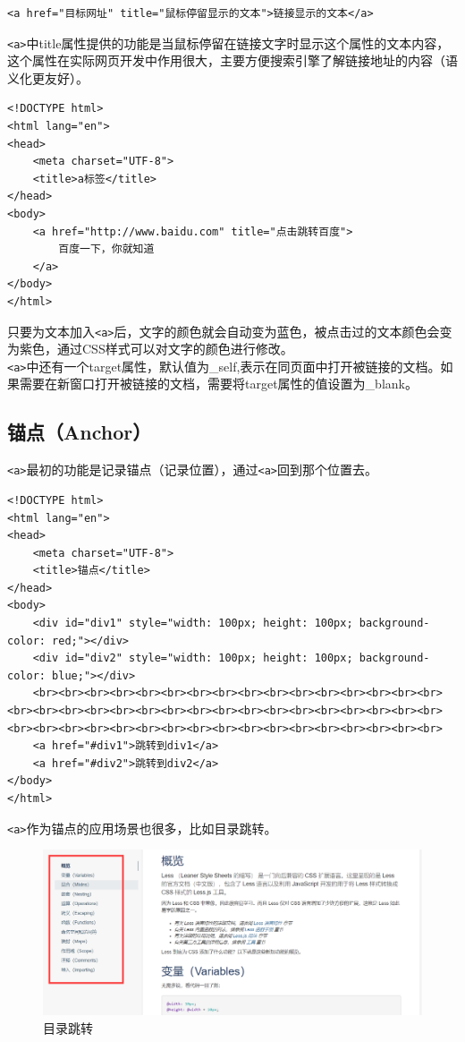 \begin{lstlisting}[style=htmlcssjs]
<a href="目标网址" title="鼠标停留显示的文本">链接显示的文本</a>
\end{lstlisting}

\lstinline|<a>|中title属性提供的功能是当鼠标停留在链接文字时显示这个属性的文本内容，这个属性在实际网页开发中作用很大，主要方便搜索引擎了解链接地址的内容（语义化更友好）。

\begin{lstlisting}[style=htmlcssjs, title=a标签]
<!DOCTYPE html>
<html lang="en">
<head>
    <meta charset="UTF-8">
    <title>a标签</title>
</head>
<body>
    <a href="http://www.baidu.com" title="点击跳转百度">
        百度一下，你就知道
    </a>
</body>
</html>
\end{lstlisting}

只要为文本加入\lstinline|<a>|后，文字的颜色就会自动变为蓝色，被点击过的文本颜色会变为紫色，通过CSS样式可以对文字的颜色进行修改。 \\

\lstinline|<a>|中还有一个target属性，默认值为\_self,表示在同页面中打开被链接的文档。如果需要在新窗口打开被链接的文档，需要将target属性的值设置为\_blank。

\subsection{锚点（Anchor）}

\lstinline|<a>|最初的功能是记录锚点（记录位置），通过\lstinline|<a>|回到那个位置去。

\begin{lstlisting}[style=htmlcssjs, title=锚点, breaklines=true, breakatwhitespace=false]
<!DOCTYPE html>
<html lang="en">
<head>
    <meta charset="UTF-8">
    <title>锚点</title>
</head>
<body>
    <div id="div1" style="width: 100px; height: 100px; background-color: red;"></div>
    <div id="div2" style="width: 100px; height: 100px; background-color: blue;"></div>
    <br><br><br><br><br><br><br><br><br><br><br><br><br><br><br><br><br><br><br><br><br><br><br><br><br><br><br><br><br><br><br><br><br><br><br><br><br><br><br><br><br><br><br><br><br><br><br><br><br><br>
    <a href="#div1">跳转到div1</a>
    <a href="#div2">跳转到div2</a>
</body>
</html>
\end{lstlisting}

\lstinline|<a>|作为锚点的应用场景也很多，比如目录跳转。

\begin{figure}[H]
    \centering
    \includegraphics[scale=0.45]{img/C3/3-4/1.png}
    \caption{目录跳转}
\end{figure}

